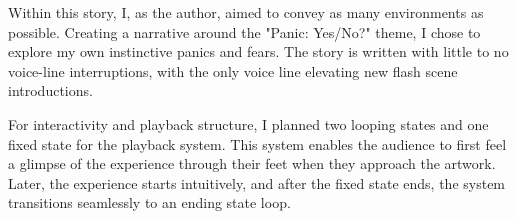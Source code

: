         Within this story, I, as the author, aimed to convey as many environments as possible. Creating a narrative around the "Panic: Yes/No?" theme, I chose to explore my own instinctive panics and fears. The story is written with little to no voice-line interruptions, with the only voice line elevating new flash scene introductions.\par

        For interactivity and playback structure, I planned two looping states and one fixed state for the playback system. This system enables the audience to first feel a glimpse of the experience through their feet when they approach the artwork. Later, the experience starts intuitively, and after the fixed state ends, the system transitions seamlessly to an ending state loop.\par